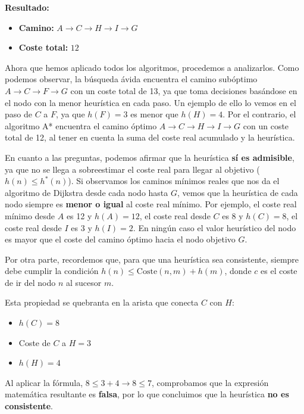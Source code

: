 \documentclass[11pt, a4paper]{article}
\newenvironment{problem}[1][Cuestión]{
	\vspace{0.5cm}
	\noindent{\Large\bfseries #1} \par\vspace{0.5cm}
}{
	\vspace{0.5cm}
}
\begin{document}
\begin{problem}[Cuestión 5 (30\%)]
{			\textbf{Resultado:}
			\begin{itemize}[label={}]
				\item \textbf{Camino:} $A \rightarrow C \rightarrow H \rightarrow I \rightarrow G$
				\item \textbf{Coste total:} $12$
			\end{itemize}

			Ahora que hemos aplicado todos los algoritmos, procedemos a analizarlos. Como podemos observar, la búsqueda ávida encuentra el camino subóptimo $A \rightarrow C \rightarrow F \rightarrow G$ con un coste total de 13, ya que toma decisiones basándose en el nodo con la menor heurística en cada paso. Un ejemplo de ello lo vemos en el paso de $C$ a $F$, ya que $h(F)=3$ es menor que $h(H)=4$. Por el contrario, el algoritmo A* encuentra el camino óptimo $A \rightarrow C \rightarrow H \rightarrow I \rightarrow G$ con un coste total de 12, al tener en cuenta la suma del coste real acumulado y la heurística.

			En cuanto a las preguntas, podemos afirmar que la heurística \textbf{sí es admisible}, ya que no se llega a sobreestimar el coste real para llegar al objetivo ($h(n)\le h^*(n)$). Si observamos los caminos mínimos reales que nos da el algoritmo de Dijkstra desde cada nodo hasta $G$, vemos que la heurística de cada nodo siempre es \textbf{menor o igual} al coste real mínimo. Por ejemplo, el coste real mínimo desde $A$ es 12 y $h(A)=12$, el coste real desde $C$ es 8 y $h(C)=8$, el coste real desde $I$ es 3 y $h(I)=2$. En ningún caso el valor heurístico del nodo es mayor que el coste del camino óptimo hacia el nodo objetivo $G$.

			Por otra parte, recordemos que, para que una heurística sea consistente, siempre debe cumplir la condición $h(n) \le \text{Coste}(n,m)+h(m)$, donde $c$ es el coste de ir del nodo $n$ al sucesor $m$.

			Esta propiedad se quebranta en la arista que conecta $C$ con $H$:

			\begin{itemize}
				\item $h(C)=8$ 
				\item Coste de $C$ a $H=3$
				\item $h(H)=4$
			\end{itemize}

			Al aplicar la fórmula, $8\le 3+4 \rightarrow 8\le 7$, comprobamos que la expresión matemática resultante es \textbf{falsa}, por lo que concluimos que la heurística \textbf{no es consistente}.
		}

		\vspace{0.5cm}
	\end{problem}
\end{document}
